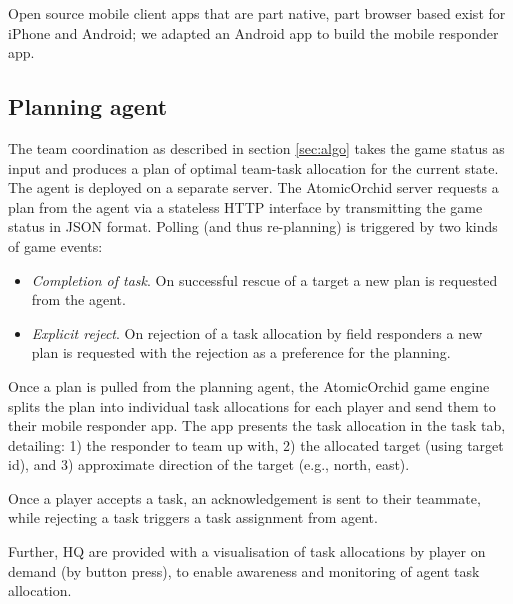 
Open source mobile client apps that are part native, part browser based exist for iPhone and Android; we adapted an Android app to build the mobile responder app.

\subsection{Planning agent}
The team coordination as described in section \ref{sec:algo} takes the game status as input and produces a plan of optimal team-task allocation for the current state. The agent is deployed on a separate server. The AtomicOrchid server requests a plan from the agent via a stateless HTTP interface by transmitting the game status in JSON format. Polling (and thus re-planning) is triggered by two kinds of game events:


\begin{itemize}
\item \textit{Completion of task}. On successful rescue of a target a new plan is requested from the agent.
\item \textit{Explicit reject}. On rejection of a task allocation by field responders a new plan is requested with the rejection as a preference for the planning.
\end{itemize} 


Once a plan is pulled from the planning agent, the AtomicOrchid game engine splits the plan into individual task allocations for each player and send them to their mobile responder app. The app presents the task allocation in the task tab, detailing: 1) the responder to team up with, 2) the allocated target (using target id), and 3) approximate direction of the target (e.g., north, east). 

Once a player accepts a task, an acknowledgement is sent to their teammate, while rejecting a task triggers a task assignment from agent.

Further, HQ are provided with a visualisation of task allocations by player on demand (by button press), to enable awareness and monitoring of agent task allocation.
 
